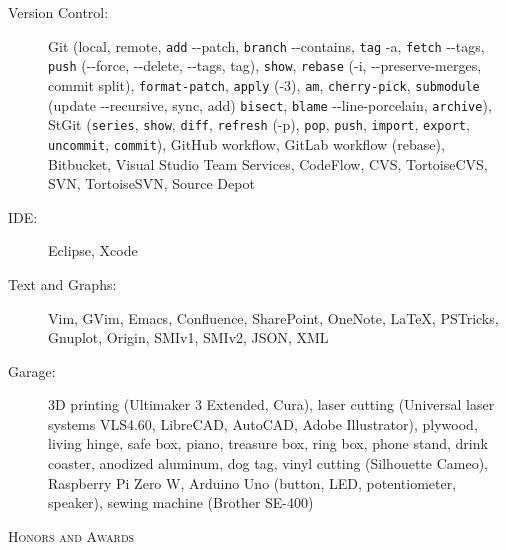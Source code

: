 \documentclass[letterpaper,11pt]{article}
\newcommand{\resheading}[1]{{\noindent\large \colorbox{mygrey}{
\begin{minipage}{1.0\textwidth}{\textsc{#1 \vphantom{p\^{E}}}}\end{minipage}}}}
\begin{document}
\begin{description}
\item[Version Control:] Git (local, remote, {\tt add} -{}-patch, {\tt branch} -{}-contains, {\tt tag} -a,
{\tt fetch} -{}-tags, {\tt push} (-{}-force, -{}-delete, -{}-tags, tag), {\tt show}, {\tt rebase} (-i, -{}-preserve-merges, commit split),
{\tt format-patch}, {\tt apply} (-3), {\tt am}, {\tt cherry-pick}, {\tt submodule} (update -{}-recursive, sync, add)
{\tt bisect}, {\tt blame} -{}-line-porcelain, {\tt archive}),
%
StGit ({\tt series}, {\tt show}, {\tt diff}, {\tt refresh} (-p), {\tt pop}, {\tt push},
{\tt import}, {\tt export}, {\tt uncommit}, {\tt commit}),
%
GitHub workflow, GitLab workflow (rebase), Bitbucket, Visual Studio Team Services,
CodeFlow, CVS, TortoiseCVS, SVN, TortoiseSVN, Source Depot

\item[IDE:] Eclipse, Xcode

\item[Text and Graphs:] Vim, GVim, Emacs, Confluence, SharePoint, OneNote, \LaTeX, PSTricks, Gnuplot, Origin, SMIv1, SMIv2, JSON, XML

\item[Garage:] 3D printing (Ultimaker 3 Extended, Cura), laser cutting (Universal laser systems VLS4.60, LibreCAD, AutoCAD, Adobe Illustrator),
plywood, living hinge, safe box, piano, treasure box, ring box, phone stand, drink coaster, anodized aluminum, dog tag,
vinyl cutting (Silhouette Cameo), Raspberry Pi Zero W, Arduino Uno (button, LED, potentiometer, speaker), sewing machine (Brother SE-400)

\end{description}




\resheading{Honors and Awards}%
\end{document}
